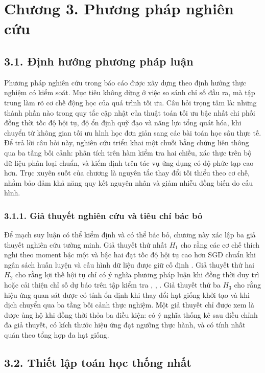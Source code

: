 \documentclass[a4paper,12pt]{article}
\begin{document}
\section{Chương 3. Phương pháp nghiên cứu}

\subsection{3.1. Định hướng phương pháp luận }

Phương pháp nghiên cứu trong báo cáo được xây dựng theo định hướng thực nghiệm có kiểm soát. Mục tiêu không dừng ở việc so sánh chỉ số đầu ra, mà tập trung làm rõ cơ chế động học của quá trình tối ưu. Câu hỏi trọng tâm là: những thành phần nào trong quy tắc cập nhật của thuật toán tối ưu bậc nhất chi phối đồng thời tốc độ hội tụ, độ ổn định quỹ đạo và năng lực tổng quát hóa, khi chuyển từ không gian tối ưu hình học đơn giản sang các bài toán học sâu thực tế. Để trả lời câu hỏi này, nghiên cứu triển khai một chuỗi bằng chứng liên thông qua ba tầng bối cảnh: phân tích trên hàm kiểm tra hai chiều, xác thực trên bộ dữ liệu phân loại chuẩn, và kiểm định trên tác vụ ứng dụng có độ phức tạp cao hơn. Trục xuyên suốt của chương là nguyên tắc thay đổi tối thiểu theo cơ chế, nhằm bảo đảm khả năng quy kết nguyên nhân và giảm nhiễu đồng biến do cấu hình.

\subsubsection{3.1.1. Giả thuyết nghiên cứu và tiêu chí bác bỏ}

Để mạch suy luận có thể kiểm định và có thể bác bỏ, chương này xác lập ba giả thuyết nghiên cứu tường minh. Giả thuyết thứ nhất $H_1$ cho rằng các cơ chế thích nghi theo moment bậc một và bậc hai đạt tốc độ hội tụ cao hơn SGD chuẩn khi ngân sách huấn luyện và cấu hình dữ liệu được giữ cố định \cite{ref1,ref2,ref3,ref4,ref5}. Giả thuyết thứ hai $H_2$ cho rằng lợi thế hội tụ chỉ có ý nghĩa phương pháp luận khi đồng thời duy trì hoặc cải thiện chỉ số dự báo trên tập kiểm tra \cite{ref8}, \cite{ref14}, \cite{ref15}. Giả thuyết thứ ba $H_3$ cho rằng hiệu ứng quan sát được có tính ổn định khi thay đổi hạt giống khởi tạo và khi dịch chuyển qua ba tầng bối cảnh thực nghiệm. Một giả thuyết chỉ được xem là được ủng hộ khi đồng thời thỏa ba điều kiện: có ý nghĩa thống kê sau điều chỉnh đa giả thuyết, có kích thước hiệu ứng đạt ngưỡng thực hành, và có tính nhất quán theo tổng hợp đa hạt giống.

\subsection{3.2. Thiết lập toán học thống nhất}
\end{document}
